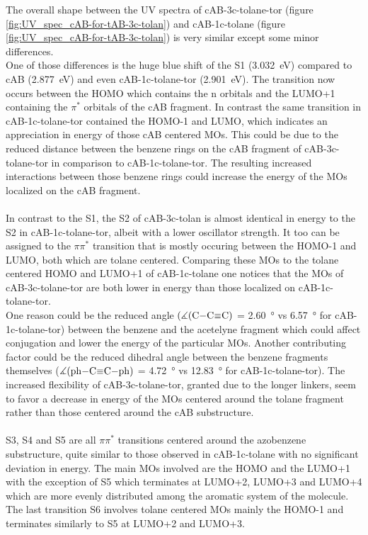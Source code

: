 %
%
The overall shape between the UV spectra of cAB-3c-tolane-tor (figure \ref{fig:UV_spec_cAB-for-tAB-3c-tolan}) and cAB-1c-tolane (figure \ref{fig:UV_spec_cAB-for-tAB-3c-tolan}) is very similar except some minor differences. \\
One of those differences is the huge blue shift of the S1 (\SI{3.032}{\eV}) compared to cAB (\SI{2.877}{\eV}) and even cAB-1c-tolane-tor (\SI{2.901}{\eV}). The transition now occurs between the HOMO which contains the n orbitals and the LUMO+1 containing the $\pi^{*}$ orbitals of the cAB fragment. In contrast the same transition in cAB-1c-tolane-tor contained the HOMO-1 and LUMO, which indicates an appreciation in energy of those cAB centered MOs. This could be due to the reduced distance between the benzene rings on the cAB fragment of cAB-3c-tolane-tor in comparison to cAB-1c-tolane-tor. The resulting increased interactions between those benzene rings %
could increase the energy of the MOs localized on the cAB fragment.\\
\\
In contrast to the S1, the S2 of cAB-3c-tolan is almost identical in energy to the S2 in cAB-1c-tolane-tor, albeit with a lower oscillator strength. It too can be assigned to the $\pi\pi^{*}$ transition that is mostly occuring between the HOMO-1 and LUMO, both which are tolane centered. 
Comparing these MOs to the tolane centered HOMO and LUMO+1 of cAB-1c-tolane one notices that the MOs of cAB-3c-tolane-tor are both lower in energy than those localized on cAB-1c-tolane-tor. \\
One reason could be the reduced angle $\left(\measuredangle(\ce{C-C#C}\right)$ = \SI{2.60}{\degree} vs \SI{6.57}{\degree} for cAB-1c-tolane-tor) between the benzene and the acetelyne fragment which could affect conjugation and lower the energy of the particular MOs. Another contributing factor could be the reduced dihedral angle between the benzene fragments themselves ($\measuredangle(\ce{ph-C#C-ph})$ = \SI{4.72}{\degree} vs \SI{12.83}{\degree} for cAB-1c-tolane-tor). The increased flexibility of cAB-3c-tolane-tor, granted due to the longer linkers, seem to favor a decrease in energy of the MOs centered around the tolane fragment rather than those centered around the cAB substructure. \\
\\
S3, S4 and S5 are all $\pi\pi^{*}$ transitions centered around the azobenzene substructure, quite similar to those observed in cAB-1c-tolane with no significant deviation in energy. The main MOs involved are the HOMO and the LUMO+1 with the exception of S5 which terminates at LUMO+2, LUMO+3 and LUMO+4 which are more evenly distributed among the aromatic system of the molecule. The last transition S6 involves tolane centered MOs mainly the HOMO-1 and terminates similarly to S5 at LUMO+2 and LUMO+3. 



